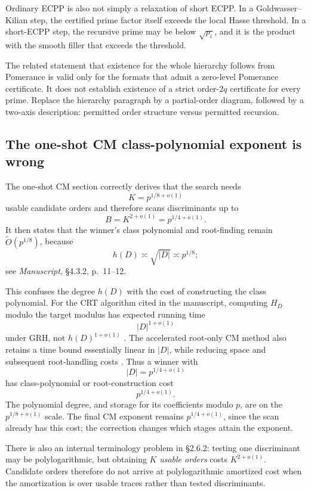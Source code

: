 \documentclass[11pt]{amsart}
\newcommand{\Ot}{\widetilde O}
\newcommand{\sourceat}[2]{\emph{Manuscript}, \S#1, p.~#2}
\begin{document}
Ordinary ECPP is also not simply a relaxation of short ECPP.  In a Goldwasser--Kilian step, the certified prime factor itself exceeds the local Hasse threshold.  In a short-ECPP step, the recursive prime may be below $\sqrt{p_i}$, and it is the product with the smooth filler that exceeds the threshold.

The related statement that existence for the whole hierarchy follows from Pomerance is valid only for the formats that admit a zero-level Pomerance certificate.  It does not establish existence of a strict order-$2q$ certificate for every prime.  Replace the hierarchy paragraph by a partial-order diagram, followed by a two-axis description: permitted order structure versus permitted recursion.

\subsection{The one-shot CM class-polynomial exponent is wrong}
\label{sec:cmerror}

The one-shot CM section correctly derives that the search needs
\[
 K=p^{1/8+o(1)}
\]
usable candidate orders and therefore scans discriminants up to
\[
 B=K^{2+o(1)}=p^{1/4+o(1)}.
\]
It then states that the winner's class polynomial and root-finding remain $\Ot(p^{1/8})$, because
\[
 h(D)\asymp \sqrt{|D|}\asymp p^{1/8};
\]
see \sourceat{4.3.2}{11--12}.

This confuses the degree $h(D)$ with the cost of constructing the class polynomial.  For the CRT algorithm cited in the manuscript, computing $H_D$ modulo the target modulus has expected running time
\[
 |D|^{1+o(1)}
\]
under GRH, not $h(D)^{1+o(1)}$ \cite{Sutherland2011}.  The accelerated root-only CM method also retains a time bound essentially linear in $|D|$, while reducing space and subsequent root-handling costs \cite{Sutherland2012}.  Thus a winner with
\[
 |D|=p^{1/4+o(1)}
\]
has class-polynomial or root-construction cost
\[
 p^{1/4+o(1)}.
\]
The polynomial degree, and storage for its coefficients modulo $p$, are on the $p^{1/8+o(1)}$ scale.  The final CM exponent remains $p^{1/4+o(1)}$, since the scan already has this cost; the correction changes which stages attain the exponent.

There is also an internal terminology problem in \S2.6.2: testing one discriminant may be polylogarithmic, but obtaining $K$ \emph{usable orders} costs $K^{2+o(1)}$.  Candidate orders therefore do not arrive at polylogarithmic amortized cost when the amortization is over usable traces rather than tested discriminants.
\end{document}
